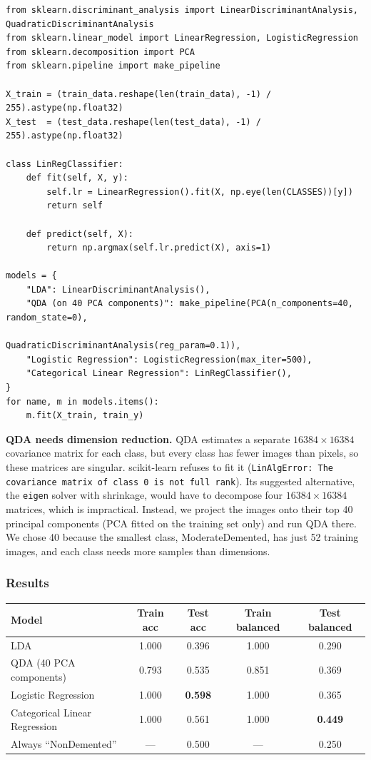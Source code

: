 \documentclass[11pt]{article}
\begin{document}
\begin{lstlisting}
from sklearn.discriminant_analysis import LinearDiscriminantAnalysis, QuadraticDiscriminantAnalysis
from sklearn.linear_model import LinearRegression, LogisticRegression
from sklearn.decomposition import PCA
from sklearn.pipeline import make_pipeline

X_train = (train_data.reshape(len(train_data), -1) / 255).astype(np.float32)
X_test  = (test_data.reshape(len(test_data), -1) / 255).astype(np.float32)

class LinRegClassifier:
    def fit(self, X, y):
        self.lr = LinearRegression().fit(X, np.eye(len(CLASSES))[y])
        return self

    def predict(self, X):
        return np.argmax(self.lr.predict(X), axis=1)

models = {
    "LDA": LinearDiscriminantAnalysis(),
    "QDA (on 40 PCA components)": make_pipeline(PCA(n_components=40, random_state=0),
                                                QuadraticDiscriminantAnalysis(reg_param=0.1)),
    "Logistic Regression": LogisticRegression(max_iter=500),
    "Categorical Linear Regression": LinRegClassifier(),
}
for name, m in models.items():
    m.fit(X_train, train_y)
\end{lstlisting}

\textbf{QDA needs dimension reduction.} QDA estimates a separate $16384 \times 16384$
covariance matrix for each class, but every class has fewer images than pixels, so these
matrices are singular. scikit-learn refuses to fit it (\texttt{LinAlgError: The covariance
matrix of class 0 is not full rank}). Its suggested alternative, the \texttt{eigen} solver
with shrinkage, would have to decompose four $16384 \times 16384$ matrices, which is
impractical. Instead, we project the images onto their top 40 principal components (PCA fitted
on the training set only) and run QDA there. We chose 40 because the smallest class,
ModerateDemented, has just 52 training images, and each class needs more samples than
dimensions.

\subsubsection*{Results}

\begin{center}
\begin{tabular}{lcccc}
\toprule
Model & Train acc & Test acc & Train balanced & Test balanced \\
\midrule
LDA                           & 1.000 & 0.396 & 1.000 & 0.290 \\
QDA (40 PCA components)       & 0.793 & 0.535 & 0.851 & 0.369 \\
Logistic Regression           & 1.000 & \textbf{0.598} & 1.000 & 0.365 \\
Categorical Linear Regression & 1.000 & 0.561 & 1.000 & \textbf{0.449} \\
\midrule
Always ``NonDemented''        & --- & 0.500 & --- & 0.250 \\
\bottomrule
\end{tabular}
\end{center}
\end{document}
